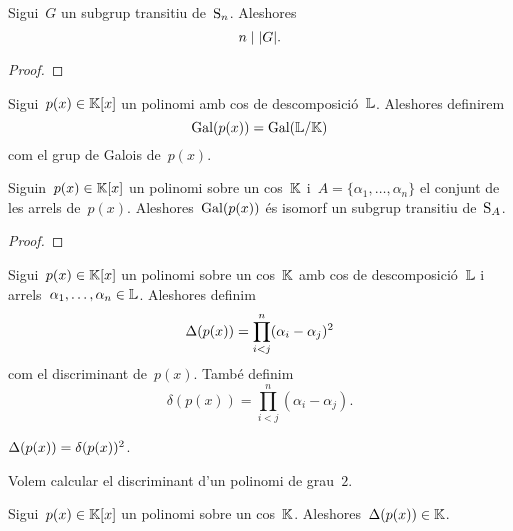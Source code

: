 \documentclass[../Apunts.tex]{subfiles}
\begin{document}
	\begin{proposition}
		\label{prop:l'ordre d'un subgrup transitiu divideix n}
		Sigui~\(G\) un subgrup transitiu de~\(\operatorname{S}_{n}\). Aleshores
		\[n\divides\card{G}.\]
	\end{proposition}
	\begin{proof}
	\end{proof}
	\begin{definition}
		\label{def:grup de Galois d'un polinomi}
		Sigui~\(p(x)\in\mathbb{K}[x]\) un polinomi amb cos de descomposició~\(\mathbb{L}\). Aleshores definirem
		\[\operatorname{Gal}(p(x))=\operatorname{Gal}(\mathbb{L}/\mathbb{K})\]
		com el grup de Galois de~\(p(x)\).
	\end{definition}
	\begin{corollary}
		\label{cor:grup de Galois d'una extensió amb un cos de descomposició}
		Siguin~\(p(x)\in\mathbb{K}[x]\) un polinomi sobre un cos~\(\mathbb{K}\) i~\(A=\{\alpha_{1},\dots,\alpha_{n}\}\) el conjunt de les arrels de~\(p(x)\). Aleshores~\(\operatorname{Gal}(p(x))\) és isomorf un subgrup transitiu de~\(\operatorname{S}_{A}\).
	\end{corollary}
	\begin{proof}
	\end{proof}
	\begin{definition}[Discriminant]
		\label{def:discriminant}
		Sigui~\(p(x)\in\mathbb{K}[x]\) un polinomi sobre un cos~\(\mathbb{K}\) amb cos de descomposició~\(\mathbb{L}\) i arrels~\(\alpha_{1},\dots,\alpha_{n}\in\mathbb{L}\). Aleshores definim
		\[\Delta(p(x))=\prod_{i<j}^{n}(\alpha_{i}-\alpha_{j})^{2}\]
		com el discriminant de~\(p(x)\). També definim
		\[\delta(p(x))=\prod_{i<j}^{n}(\alpha_{i}-\alpha_{j}).\]
	\end{definition}
	\begin{observation}
		\label{obs:discriminant}
		\(\Delta(p(x))=\delta(p(x))^{2}\).
	\end{observation}
	\begin{example}
		\label{ex:discriminant d'un polinomi quadràtic}
		Volem calcular el discriminant d'un polinomi de grau~\(2\).
	\end{example}
	\begin{solution}
	\end{solution}
	\begin{proposition}
		\label{prop:el discriminant pertany al cos del polinomi}
		Sigui~\(p(x)\in\mathbb{K}[x]\) un polinomi sobre un cos~\(\mathbb{K}\). Aleshores~\(\Delta(p(x))\in\mathbb{K}\).
	\end{proposition}
\end{document}
